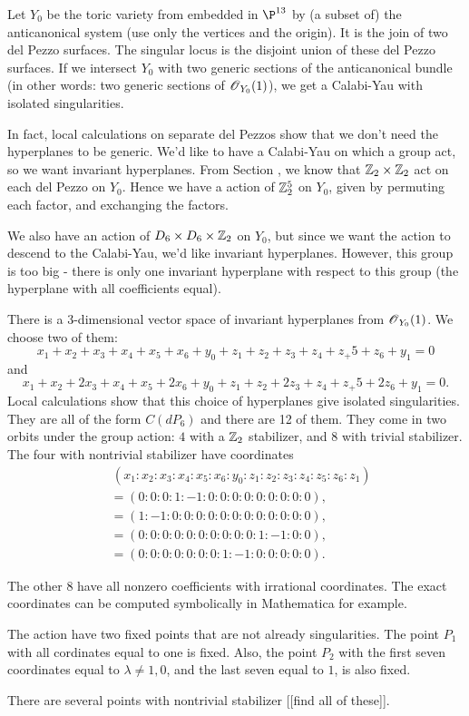 \documentclass[11pt, english]{article}
\begin{document}
Let $Y_0$ be the toric variety from \label{sec:toric5} embedded in $\P^{13}$ by (a subset of) the anticanonical system (use only the vertices and the origin). It is the join of two del Pezzo surfaces. The singular locus is the disjoint union of these del Pezzo surfaces. If we intersect $Y_0$ with two generic sections of the anticanonical bundle (in other words: two generic sections of $\operatorname{\mathscr{O}}_{Y_0}(1)$), we get a Calabi-Yau with isolated singularities.

In fact, local calculations on separate del Pezzos show that we don't need the hyperplanes to be generic. We'd like to have a Calabi-Yau on which a group act, so we want invariant hyperplanes. From Section \label{sec:delpezzoz2}, we know that $\mathbb{Z}_2 \times \mathbb{Z}_2$ act on each del Pezzo on $Y_0$. Hence we have a action of $\mathbb{Z}_2^5$ on $Y_0$, given by permuting each factor, and exchanging the factors.

\begin{remark}
We also have an action of $D_6 \times D_6 \times \mathbb{Z}_2$ on $Y_0$, but since we want the action to descend to the Calabi-Yau, we'd like invariant hyperplanes. However, this group is too big - there is only one invariant hyperplane with respect to this group (the hyperplane with all coefficients equal).
\end{remark}

There is a 3-dimensional vector space of invariant hyperplanes from $\operatorname{\mathscr{O}}_{Y_0}(1)$. We choose two of them:
\[
x_1+x_2+x_3+x_4+x_5+x_6+y_0+z_1+z_2+z_3+z_4+z_+5+z_6+y_1 = 0
\]
and
\[
x_1+x_2+2x_3+x_4+x_5+2x_6+y_0+z_1+z_2+2z_3+z_4+z_+5+2z_6+y_1 = 0.
\]
Local calculations show that this choice of hyperplanes give isolated singularities. They are all of the form $C(dP_6)$ and there are 12 of them. They come in two orbits under the group action: $4$ with a $\mathbb{Z}_2$ stabilizer, and $8$ with trivial stabilizer. The four with nontrivial stabilizer have coordinates
\begin{align*}
&\, (x_1:x_2:x_3:x_4:x_5:x_6:y_0:z_1:z_2:z_3:z_4:z_5:z_6:z_1)  \\
&= (0:0:0:1:-1:0:0:0:0:0:0:0:0:0), \\
&= (1:-1:0:0:0:0:0:0:0:0:0:0:0:0), \\
&= (0:0:0:0:0:0:0:0:0:0:1:-1:0:0), \\
&= (0:0:0:0:0:0:0:1:-1:0:0:0:0:0).
\end{align*}

The other $8$ have all nonzero coefficients with irrational coordinates. The exact coordinates can be computed symbolically in Mathematica for example.

The action have two fixed points that are not already singularities. The point $P_1$ with all cordinates equal to one is fixed. Also, the point $P_2$ with the first seven coordinates equal to $\lambda \neq 1,0$, and the last seven equal to $1$, is also fixed.

There are several points with nontrivial stabilizer [[find all of these]].
\end{document}
